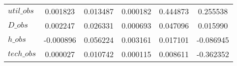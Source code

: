 \begin{center}
\begin{longtable}{lccccc}
$util\_obs      $	 & 	        0.001823	 & 	        0.013487	 & 	        0.000182	 & 	        0.444873	 & 	        0.255538 \\ 
$D\_obs         $	 & 	        0.002247	 & 	        0.026331	 & 	        0.000693	 & 	        0.047096	 & 	        0.015990 \\ 
$h\_obs         $	 & 	       -0.000896	 & 	        0.056224	 & 	        0.003161	 & 	        0.017101	 & 	       -0.086945 \\ 
$tech\_obs      $	 & 	        0.000027	 & 	        0.010742	 & 	        0.000115	 & 	        0.008611	 & 	       -0.362352 \\ 
\end{longtable}
 \end{center}
